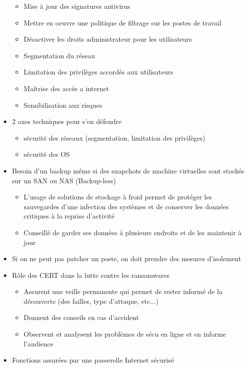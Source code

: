 \documentclass[a4paper]{article}
\begin{document}
\begin{itemize}[label=\textbullet, font=\Large]
\begin{itemize}[label=, font=\scriptsize]
      \item Mise à jour des signatures antivirus
      \item Mettre en oeuvre une politique de filtrage sur les postes de travail
      \item Désactiver les droits administrateur pour les utilisateurs
      \item Segmentation du réseau
      \item Limitation des privilèges accordés aux utilisateurs
      \item Maîtrise des accès a internet
      \item Sensibilisation aux risques
    \end{itemize}
    \item 2 axes techniques pour s'en défendre
    \begin{itemize}[label=, font=\scriptsize]
      \item sécurité des réseaux (segmentation, limitation des privilèges)
      \item sécurité des OS
    \end{itemize}
    \item Besoin d'un backup même si des snapchots de machine virtuelles sont stockés sur un SAN ou NAS (Backup-less)
    \begin{itemize}[label=, font=\scriptsize]
      \item L'usage de solutions de stockage à froid permet de protéger les sauvegardes d'une infection des systèmes et de conserver 
      les données critiques à la reprise d'activité
      \item Conseillé de garder ses données à plusieurs endroits et de les maintenir à jour
    \end{itemize}
    \item Si on ne peut pas patcher un poste, on doit prendre des mesures d'isolement
    \item Rôle des CERT dans la lutte contre les ransomwares
    \begin{itemize}[label=, font=\scriptsize]
      \item Assurent une veille permanente qui permet de rester informé de la découverte (des failles, type d'attaque, etc...)
      \item Donnent des conseils en cas d'accident
      \item Observent et analysent les problèmes de sécu en ligne et en informe l'audience
    \end{itemize}
    \item Fonctions assurées par une passerelle Internet sécurisé

\end{itemize}
\end{document}
